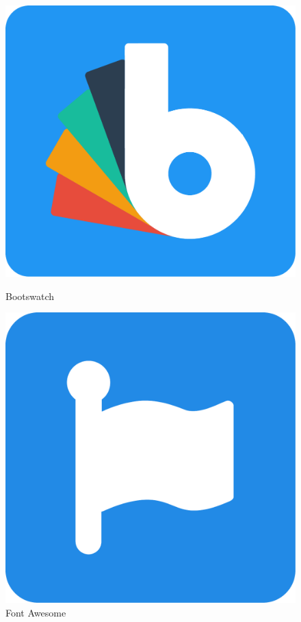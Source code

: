 \begin{figure}[!h]
    \centering
    \begin{minipage}[c]{0.4\textwidth}
        \centering
        \includegraphics[scale=0.15]
        {textures/images/tools/bootswatch.pdf}
        \caption{Bootswatch}\label{fig:bootswatch}
    \end{minipage} \qquad
    \begin{minipage}[c]{0.4\textwidth}
        \centering
        \includegraphics[scale=0.14]
        {textures/images/tools/fontAwesome.pdf}
        \caption{Font Awesome}\label{fig:font_awesome}
    \end{minipage}
\end{figure}
